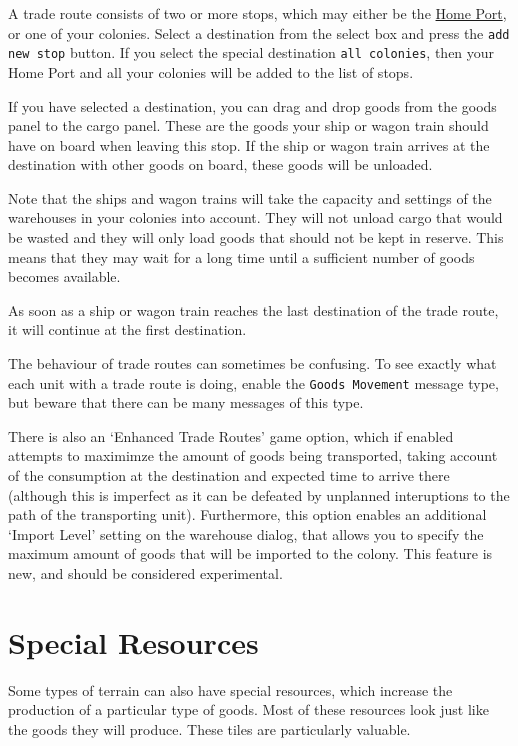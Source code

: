 \documentclass[12pt]{book}
\begin{document}
A trade route consists of two or more stops, which may either be the
\hyperlink{Home Port}{Home Port}, or one of your colonies. Select a
destination from the select box and press the \texttt{add new stop}
button. If you select the special destination \texttt{all colonies},
then your Home Port and all your colonies will be added to the list of
stops.

If you have selected a destination, you can drag and drop goods from
the goods panel to the cargo panel. These are the goods your ship or
wagon train should have on board when leaving this stop. If the ship
or wagon train arrives at the destination with other goods on board,
these goods will be unloaded.

Note that the ships and wagon trains will take the capacity and
settings of the warehouses in your colonies into account. They will
not unload cargo that would be wasted and they will only load goods
that should not be kept in reserve. This means that they may wait
for a long time until a sufficient number of goods becomes available.

As soon as a ship or wagon train reaches the last destination of the
trade route, it will continue at the first destination.

The behaviour of trade routes can sometimes be confusing. To see
exactly what each unit with a trade route is doing, enable the
\texttt{Goods Movement} message type, but beware that there can be
many messages of this type.

There is also an `Enhanced Trade Routes' game option, which if enabled
attempts to maximimze the amount of goods being transported, taking
account of the consumption at the destination and expected time to
arrive there (although this is imperfect as it can be defeated by
unplanned interuptions to the path of the transporting unit).
Furthermore, this option enables an additional `Import Level' setting
on the warehouse dialog, that allows you to specify the maximum amount
of goods that will be imported to the colony. This feature is new,
and should be considered experimental.

\hypertarget{Resources}{\section{Special Resources}}

Some types of terrain can also have special resources, which increase
the production of a particular type of goods. Most of these resources
look just like the goods they will produce. These tiles are
particularly valuable.
\end{document}

